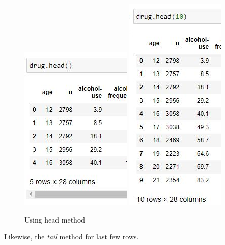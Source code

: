 \begin{figure}[ht]
	\centering
	\includegraphics{Assets/Images/Pandas/head}
	\includegraphics{Assets/Images/Pandas/head10}
	\caption{Using head method}
	\label{fig:head}
\end{figure}

\noindent Likewise, the \textit{tail} method for last few rows.

